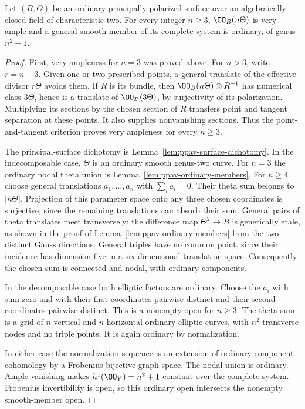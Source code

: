 \begin{lemma}
\label{lem:DE-A3-ordinary-principal-multiples}
Let $(B,\Theta)$ be an ordinary principally polarized surface over an
algebraically closed field of characteristic two.  For every integer
$n\ge3$, $\OO_B(n\Theta)$ is very ample and a general smooth member
of its complete system is ordinary, of genus $n^2+1$.
\end{lemma}
\begin{proof}
First, very ampleness for $n=3$ was proved above.  For $n>3$,
write $r=n-3$.  Given one or two prescribed points, a general
translate of the effective divisor $r\Theta$ avoids them.  If $R$
is its bundle, then $\OO_B(n\Theta)\otimes R^{-1}$ has numerical
class $3\Theta$, hence is a translate of $\OO_B(3\Theta)$, by
surjectivity of its polarization.  Multiplying its sections by the
chosen section of $R$ transfers point and tangent separation at
these points.  It also supplies nonvanishing sections.  Thus the
point-and-tangent criterion proves very ampleness for every $n\ge3$.

The principal-surface dichotomy is
Lemma~\ref{lem:ppav-surface-dichotomy}.  In the indecomposable case,
$\Theta$ is an ordinary smooth genus-two curve.  For $n=3$ the
ordinary nodal theta union is Lemma~\ref{lem:ppav-ordinary-members}.
For $n\ge4$ choose general translations $a_1,\ldots,a_n$ with
$\sum_i a_i=0$.  Their theta sum belongs to $|n\Theta|$.
Projection of this parameter space onto any three chosen coordinates
is surjective, since the remaining translations can absorb their sum.
General pairs of theta translates meet transversely: the difference
map $\Theta^2\to B$ is generically etale, as shown in the proof of
Lemma~\ref{lem:ppav-ordinary-members} from the two distinct Gauss
directions.  General triples have no common point, since their
incidence has dimension five in a six-dimensional translation space.
Consequently the chosen sum is connected and nodal, with ordinary
components.

In the decomposable case both elliptic factors are ordinary.  Choose
the $a_i$ with sum zero and with their first coordinates pairwise
distinct and their second coordinates pairwise distinct.  This is a
nonempty open for $n\ge3$.  The theta sum is a grid of $n$ vertical
and $n$ horizontal ordinary elliptic curves, with $n^2$ transverse
nodes and no triple points.  It is again ordinary by normalization.

In either case the normalization sequence is an extension of ordinary
component cohomology by a Frobenius-bijective graph space.  The nodal
union is ordinary.  Ample vanishing makes $h^1(\OO_Y)=n^2+1$
constant over the complete system.  Frobenius invertibility is open,
so this ordinary open intersects the nonempty smooth-member open.
\end{proof}

